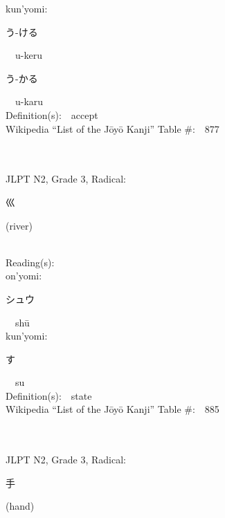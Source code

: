 \begin{multicols}{2}
{\hspace*{1em}}kun'yomi:\ \ \\
{\hspace*{2em}}{\begin{CJK}{UTF8}{min} う-ける \end{CJK}}\ \ u-keru\ \ \\
{\hspace*{2em}}{\begin{CJK}{UTF8}{min} う-かる \end{CJK}}\ \ u-karu\ \ \\
Definition(s):\ \ accept \\
Wikipedia ``List of the J\=oy\=o Kanji'' Table \#:\ \ 877 \\
\ \ \\
{\fontsize{34pt}{40pt}  }\ \ \\  %
{JLPT N2, Grade 3, Radical:\ \ {\begin{CJK}{UTF8}{min} 巛 \end{CJK}} (river) } \\
Reading(s):\ \ \\
{\hspace*{1em}}on'yomi:\ \ \\
{\hspace*{2em}}{\begin{CJK}{UTF8}{min} シュウ \end{CJK}}\ \ sh\=u\ \ \\
{\hspace*{1em}}kun'yomi:\ \ \\
{\hspace*{2em}}{\begin{CJK}{UTF8}{min} す \end{CJK}}\ \ su\ \ \\
Definition(s):\ \ state \\
Wikipedia ``List of the J\=oy\=o Kanji'' Table \#:\ \ 885 \\
\ \ \\
{\fontsize{34pt}{40pt}  }\ \ \\  %
{JLPT N2, Grade 3, Radical:\ \ {\begin{CJK}{UTF8}{min} 手 \end{CJK}} (hand) } \\

\end{multicols}
